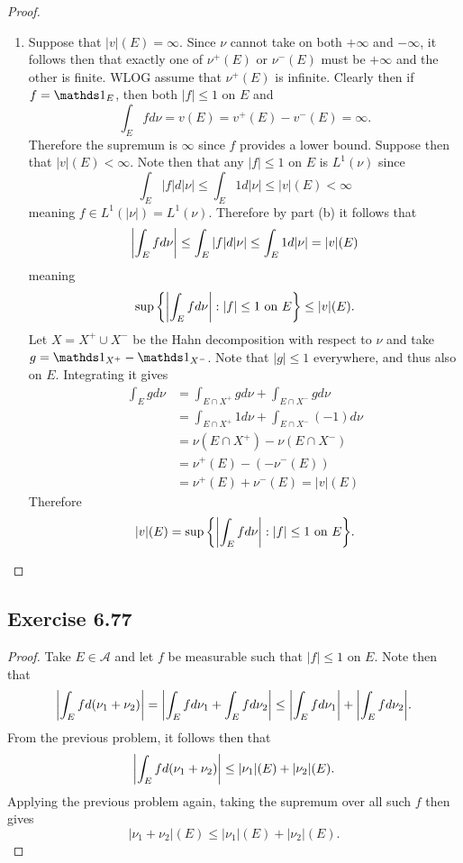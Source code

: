 \documentclass[hw_all.tex]{subfiles}
\begin{document}
\begin{proof}
\begin{enumerate}
        \item 
            Suppose that $|v|(E) = \infty$. Since $\nu$ cannot take on both $+\infty$ and $-\infty$, it follows then that exactly one of $\nu^+(E)$ or $\nu^-(E)$ must be $+\infty$ and the other is finite. WLOG assume that $\nu^+(E)$ is infinite. Clearly then if $f = \ind{E}$, then both $|f| \leq 1$ on $E$ and
            \[
                \int_{E} f d \nu = v(E) = v^+(E) - v^-(E) = \infty
            .\]
            Therefore the supremum is $\infty$ since $f$ provides a lower bound. Suppose then that $|v|(E) < \infty$. Note then that any $|f| \leq 1$ on $E$ is $L^1(\nu)$ since
            \[
                \int_E |f| d|\nu| \leq \int_E 1 d|\nu| \leq |v|(E) < \infty
            \]
            meaning $f \in L^1(|\nu|) = L^1(\nu)$. Therefore by part (b) it follows that
            \[
                \qty| \int_E f d \nu | \leq \int_E |f| d|\nu| \leq \int_E 1 d|\nu| = |v|(E)
            \]
            meaning
            \[
                \sup\qty{\qty|\int_E f d \nu| : |f| \leq 1 \text{ on } E} \leq |v|(E)
            .\]
            Let $X = X^+ \cup X^-$ be the Hahn decomposition with respect to $\nu$ and take $g = \ind{X^+} - \ind{X^-}$. Note that $|g| \leq 1$ everywhere, and thus also on $E$. Integrating it gives
            \begin{align*}
                \int_E g d \nu &= \int_{E \cap X^+} g d \nu + \int_{E \cap X^-} g d \nu \\
                               &= \int_{E \cap X^+} 1 d \nu + \int_{E \cap X^-} (-1) d \nu \\
                               &= \nu(E \cap X^+) - \nu(E \cap X^-) \\
                               &= \nu^+(E) - (-\nu^-(E)) \\
                               &= \nu^+(E) + \nu^-(E) = |v|(E)
            \end{align*}
            Therefore
            \[
                |v|(E) = \sup\qty{\qty|\int_E f d \nu| : |f| \leq 1 \text{ on } E}
            .\]
    \end{enumerate}
\end{proof}

\subsection{Exercise 6.77}
\begin{proof}
    Take $E \in \mathcal{A}$ and let $f$ be measurable such that $|f| \leq 1$ on $E$. Note then that
    \[
        \qty|\int_{E} f d(\nu_1 + \nu_2)| = \qty|\int_E f d \nu_1 + \int_E f d \nu_2| \leq \qty|\int_E f d \nu_1| + \qty|\int_E f d \nu_2|
    .\]
    From the previous problem, it follows then that
    \[
        \qty|\int_{E} f d(\nu_1 + \nu_2)| \leq |\nu_1|(E) + |\nu_2|(E)
    .\]
    Applying the previous problem again, taking the supremum over all such $f$ then gives
    \[
        |\nu_1+\nu_2|(E) \leq |\nu_1|(E) + |\nu_2|(E)
    .\]
\end{proof}
\end{document}
